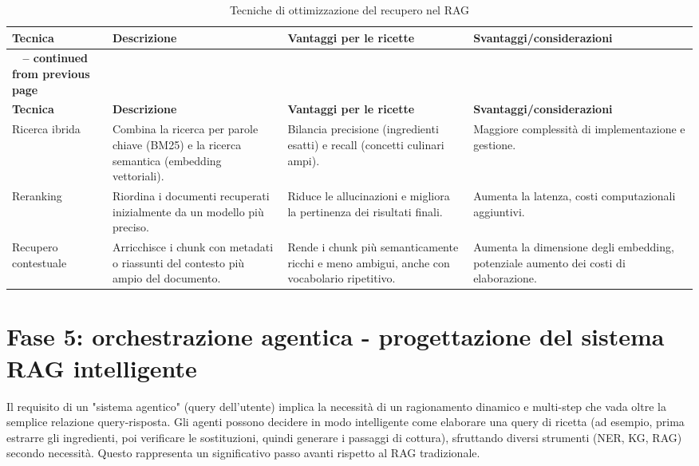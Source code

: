 \documentclass[a4paper, 11pt]{article}
\begin{document}
\begin{longtable}{>{\raggedright\arraybackslash}p{3cm} >{\raggedright\arraybackslash}p{4.5cm} >{\raggedright\arraybackslash}p{4.5cm} >{\raggedright\arraybackslash}p{4.5cm}}
\caption{Tecniche di ottimizzazione del recupero nel RAG}\\
\toprule
\textbf{Tecnica} & \textbf{Descrizione} & \textbf{Vantaggi per le ricette} & \textbf{Svantaggi/considerazioni} \\
\midrule
\endfirsthead
\multicolumn{4}{c}%
{{\bfseries \tablename\ \thetable{} -- continued from previous page}} \\
\toprule
\textbf{Tecnica} & \textbf{Descrizione} & \textbf{Vantaggi per le ricette} & \textbf{Svantaggi/considerazioni} \\
\midrule
\endhead
\bottomrule
\endfoot
Ricerca ibrida \cite{hybrid_search_vectorchord} & Combina la ricerca per parole chiave (BM25) e la ricerca semantica (embedding vettoriali). & Bilancia precisione (ingredienti esatti) e recall (concetti culinari ampi). \cite{hybrid_search_vectorchord} & Maggiore complessità di implementazione e gestione. \cite{hybrid_search_vectorchord} \\
\addlinespace
Reranking \cite{mastering_rag_reranking} & Riordina i documenti recuperati inizialmente da un modello più preciso. & Riduce le allucinazioni e migliora la pertinenza dei risultati finali. \cite{mastering_rag_reranking} & Aumenta la latenza, costi computazionali aggiuntivi. \cite{reranking_mechanisms_medium} \\
\addlinespace
Recupero contestuale \cite{contextual_retrieval_pluralsight} & Arricchisce i chunk con metadati o riassunti del contesto più ampio del documento. & Rende i chunk più semanticamente ricchi e meno ambigui, anche con vocabolario ripetitivo. \cite{contextual_retrieval_mlexpert} & Aumenta la dimensione degli embedding, potenziale aumento dei costi di elaborazione. \cite{contextual_retrieval_somawansa} \\
\end{longtable}

\section{Fase 5: orchestrazione agentica - progettazione del sistema RAG intelligente}
Il requisito di un "sistema agentico" (query dell'utente) implica la necessità di un ragionamento dinamico e multi-step che vada oltre la semplice relazione query-risposta. Gli agenti possono decidere in modo intelligente come elaborare una query di ricetta (ad esempio, prima estrarre gli ingredienti, poi verificare le sostituzioni, quindi generare i passaggi di cottura), sfruttando diversi strumenti (NER, KG, RAG) secondo necessità. Questo rappresenta un significativo passo avanti rispetto al RAG tradizionale.
\end{document}
